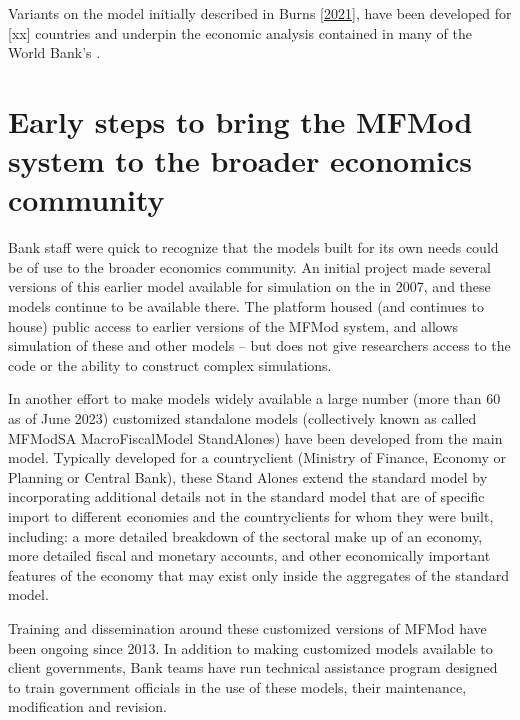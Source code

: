 \documentclass[letterpaper,10pt,english]{jupyterBook}
\begin{document}
\sphinxAtStartPar
Variants on the model initially described in  Burns  {[}\hyperlink{cite.content/99_BackMatter/References:id14}{2021}{]}, have been developed for {[}xx{]} countries and underpin the economic analysis contained in many of the World Bank’s  .


\section{Early steps to bring the MFMod system to the broader economics community}
\label{\detokenize{content/01_Introduction/Introduction:early-steps-to-bring-the-mfmod-system-to-the-broader-economics-community}}
\sphinxAtStartPar
Bank staff were quick to recognize that the models built for its own needs could be of use to the broader economics community. An initial project  made several versions of this earlier model available for simulation on the  in 2007, and these models continue to be available there.  The  platform housed (and continues to house) public access to earlier versions of the MFMod system, and allows simulation of these and other models – but does not give researchers access to the code or the ability to construct complex simulations.

\sphinxAtStartPar
In another effort to make models widely available a large number (more than 60 as of June 2023) customized stand\sphinxhyphen{}alone models (collectively known as called MFModSA \sphinxhyphen{} MacroFiscalModel StandAlones)  have been developed from the main model. Typically developed for a country\sphinxhyphen{}client (Ministry of Finance, Economy or Planning or Central Bank), these Stand Alones extend the standard model by incorporating additional details not in the standard model that are of specific import to different economies and the country\sphinxhyphen{}clients for whom they were built, including: a more detailed breakdown of the sectoral make up of an economy, more detailed fiscal and monetary accounts, and other economically important features of the economy that may exist only inside the aggregates of the standard model.

\sphinxAtStartPar
Training and dissemination around these customized versions of MFMod have been ongoing since 2013. In addition to making customized models available to client governments, Bank teams have run technical assistance program designed to train government officials in the use of these models, their maintenance, modification and revision.
\end{document}
